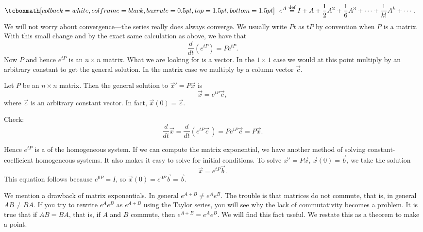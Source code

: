 \begin{equation*}
\mybxbg{~~
e^A \overset{\text{def}}{=} I + A + \frac{1}{2} A^2 + 
\frac{1}{6} A^3 + \cdots + \frac{1}{k!} A^k + \cdots
.
~~}
\end{equation*}
We will not worry about convergence---the series really does
always converge.
We usually write $Pt$ as $tP$ by convention when $P$ is a matrix.
With this small change and by the exact same
calculation as above,
we have that
\begin{equation*}
\frac{d}{dt} \left(e^{tP} \right) = 
P e^{tP} .
\end{equation*}
Now $P$ and hence $e^{tP}$ is an $n \times n$ matrix.  What we are looking
for is a vector.  In the $1 \times 1$ case we would at this
point multiply by an arbitrary constant to get the general solution.  In the
matrix case we multiply by a column vector $\vec{c}$.

\begin{theorem}
Let $P$ be an $n \times n$ matrix.  Then the general solution to
${\vec{x}}' = P \vec{x}$ is
\begin{equation*}
\vec{x} = e^{tP} \vec{c} ,
\end{equation*}
where $\vec{c}$ is an arbitrary constant vector.  In fact, $\vec{x}(0) =
\vec{c}$.
\end{theorem}

Check:
\begin{equation*}
\frac{d}{dt}
\vec{x} =
\frac{d}{dt} \left( 
e^{tP} \vec{c}\, \right)
=
P e^{tP} \vec{c} =
P \vec{x}.
\end{equation*}

Hence $e^{tP}$ is a 
of the homogeneous system.
If we can compute the matrix exponential,
we have another method of solving constant-coefficient homogeneous
systems.  It also makes it easy to solve for initial conditions.  To solve 
${\vec{x}}' = P \vec{x}$, $\vec{x}(0) = \vec{b}$, we take the solution
\begin{equation*}
\vec{x} = e^{tP} \vec{b} .
\end{equation*}
This equation follows because $e^{0P} = I$,
so $\vec{x} (0) = e^{0P} \vec{b} = \vec{b}$.

\medskip

We mention a drawback of matrix exponentials.
In general $e^{A+B} \neq e^A e^B$.  The trouble is that matrices do
not commute, that is, in general $AB \neq BA$.
If you try to rewrite $e^A e^B$ as $e^{A+B}$ using the Taylor series,
you will see why the lack of commutativity becomes a problem.
It is true that if
$AB = BA$, that is, if $A$ and $B$ commute, then $e^{A+B} = e^Ae^B$.  We will
find this fact useful.  We restate this as a theorem to make a point.


